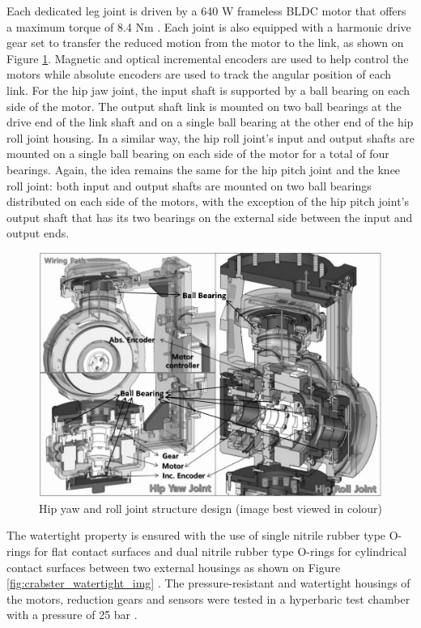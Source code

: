 Each dedicated leg joint is driven by a 640 W frameless BLDC motor that offers a maximum torque of 8.4 Nm \cite{shim_development_2016}. Each joint is also equipped with a harmonic drive gear set to transfer the reduced motion from the motor to the link, as shown on Figure \ref{fig:crabster_leg_joint_img}. Magnetic and optical incremental encoders are used to help control the motors while absolute encoders are used to track the angular position of each link. For the hip jaw joint, the input shaft is supported by a ball bearing on each side of the motor. The output shaft link is mounted on two ball bearings at the drive end of the link shaft and on a single ball bearing at the other end of the hip roll joint housing. In a similar way, the hip roll joint's input and output shafts are mounted on a single ball bearing on each side of the motor for a total of four bearings. Again, the idea remains the same for the hip pitch joint and the knee roll joint: both input and output shafts are mounted on two ball bearings distributed on each side of the motors, with the exception of the hip pitch joint's output shaft that has its two bearings on the external side between the input and output ends.

\begin{figure}[H]
    \centering
    \includegraphics[width=\textwidth]{Sections/LiteratureReview/img/Crabster/crabster_leg_joint.jpg}
    \caption{Hip yaw and roll joint structure design (image best viewed in colour) \cite{shim_development_2016}}
    \label{fig:crabster_leg_joint_img}
\end{figure}

The watertight property is ensured with the use of single nitrile rubber type O-rings for flat contact surfaces and dual nitrile rubber type O-rings for cylindrical contact surfaces between two external housings as shown on Figure \ref{fig:crabster_watertight_img} \cite{shim_development_2016}. The pressure-resistant and watertight housings of the motors, reduction gears and sensors were tested in a hyperbaric test chamber with a pressure of 25 bar \cite{shim_development_2016}.

